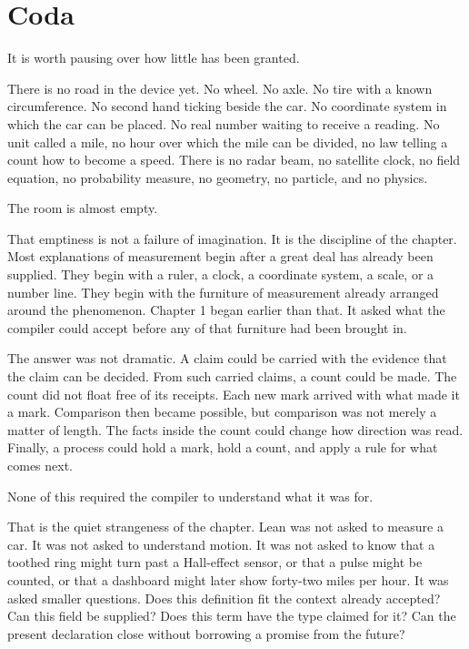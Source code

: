 \section*{Coda}

It is worth pausing over how little has been granted.

There is no road in the device yet. No wheel. No axle. No tire with a known
circumference. No second hand ticking beside the car. No coordinate system in
which the car can be placed. No real number waiting to receive a reading. No
unit called a mile, no hour over which the mile can be divided, no law telling
a count how to become a speed. There is no radar beam, no satellite clock, no
field equation, no probability measure, no geometry, no particle, and no
physics.

The room is almost empty.

That emptiness is not a failure of imagination. It is the discipline of the
chapter. Most explanations of measurement begin after a great deal has already
been supplied. They begin with a ruler, a clock, a coordinate system, a scale,
or a number line. They begin with the furniture of measurement already arranged
around the phenomenon. Chapter 1 began earlier than that. It asked what the
compiler could accept before any of that furniture had been brought in.

The answer was not dramatic. A claim could be carried with the evidence that
the claim can be decided. From such carried claims, a count could be made. The
count did not float free of its receipts. Each new mark arrived with what made
it a mark. Comparison then became possible, but comparison was not merely a
matter of length. The facts inside the count could change how direction was
read. Finally, a process could hold a mark, hold a count, and apply a rule for
what comes next.

None of this required the compiler to understand what it was for.

That is the quiet strangeness of the chapter. Lean was not asked to measure a
car. It was not asked to understand motion. It was not asked to know that a
toothed ring might turn past a Hall-effect sensor, or that a pulse might be
counted, or that a dashboard might later show forty-two miles per hour. It was
asked smaller questions. Does this definition fit the context already accepted?
Can this field be supplied? Does this term have the type claimed for it? Can
the present declaration close without borrowing a promise from the future?

